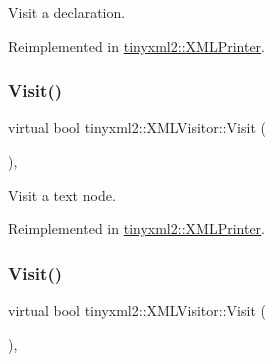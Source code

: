 Visit a declaration. 



Reimplemented in \mbox{\hyperlink{classtinyxml2_1_1_x_m_l_printer_acfc625b2549304b9c7eb85ebd5c5eb39}{tinyxml2\+::\+X\+M\+L\+Printer}}.

\mbox{\label{classtinyxml2_1_1_x_m_l_visitor_af30233565856480ea48b6fa0d6dec65b}} 
\subsubsection{\texorpdfstring{Visit()}{Visit()}\hspace{0.1cm}{\footnotesize\ttfamily [2/4]}}
{\footnotesize\ttfamily virtual bool tinyxml2\+::\+X\+M\+L\+Visitor\+::\+Visit (\begin{DoxyParamCaption}\item[{const \mbox{\hyperlink{classtinyxml2_1_1_x_m_l_text}{X\+M\+L\+Text}} \&}]{ }\end{DoxyParamCaption})\hspace{0.3cm}{\ttfamily [inline]}, {\ttfamily [virtual]}}



Visit a text node. 



Reimplemented in \mbox{\hyperlink{classtinyxml2_1_1_x_m_l_printer_adc0e42b4f6fcb90a95630c79575d030b}{tinyxml2\+::\+X\+M\+L\+Printer}}.

\mbox{\label{classtinyxml2_1_1_x_m_l_visitor_acc8147fb5a85f6c65721654e427752d7}} 
\subsubsection{\texorpdfstring{Visit()}{Visit()}\hspace{0.1cm}{\footnotesize\ttfamily [3/4]}}
{\footnotesize\ttfamily virtual bool tinyxml2\+::\+X\+M\+L\+Visitor\+::\+Visit (\begin{DoxyParamCaption}\item[{const \mbox{\hyperlink{classtinyxml2_1_1_x_m_l_comment}{X\+M\+L\+Comment}} \&}]{ }\end{DoxyParamCaption})\hspace{0.3cm}{\ttfamily [inline]}, {\ttfamily [virtual]}}




